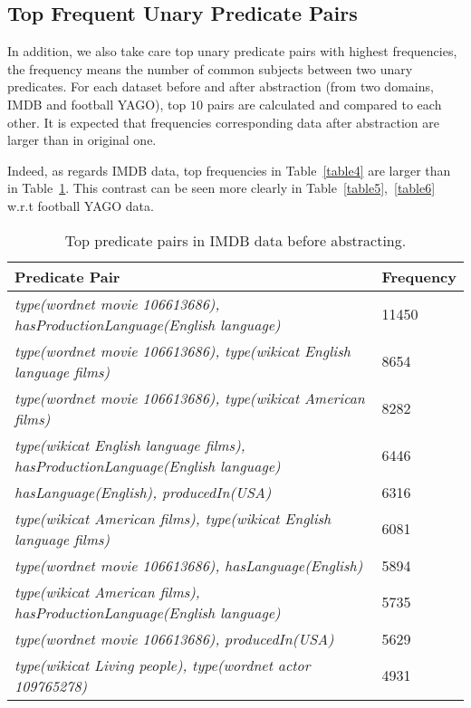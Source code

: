 \documentclass{acm_proc_article-sp}
\begin{document}
\subsection{Top Frequent Unary Predicate Pairs}

In addition, we also take care top unary predicate pairs with highest frequencies, the frequency means the number of common subjects between two unary predicates. For each dataset before and after abstraction (from two domains, IMDB and football YAGO), top $10$ pairs are calculated and compared to each other. It is expected that frequencies corresponding data after abstraction are larger than in original one.

Indeed, as regards IMDB data, top frequencies in Table~\ref{table4} are larger than in Table~\ref{table3}. This contrast can be seen more clearly in Table~\ref{table5},~\ref{table6} w.r.t football YAGO data.

\begin{table}
\caption{Top predicate pairs in IMDB data before abstracting.}
\label{table3}
\begin{center}
\begin{tabular}{ |p{6cm}|p{1.5cm}| } 
\hline
Predicate Pair & Frequency\\
\hline
\textit{type(wordnet movie 106613686), hasProductionLanguage(English language)} & 11450 \\
\hline
\textit{type(wordnet movie 106613686), type(wikicat English language films)} & 8654 \\
\hline
\textit{type(wordnet movie 106613686), type(wikicat American films)} & 8282 \\
\hline
\textit{type(wikicat English language films), hasProductionLanguage(English language)} & 6446 \\
\hline
\textit{hasLanguage(English), producedIn(USA)} & 6316 \\
\hline
\textit{type(wikicat American films), type(wikicat English language films)} & 6081 \\
\hline
\textit{type(wordnet movie 106613686), hasLanguage(English)} & 5894 \\
\hline
\textit{type(wikicat American films), hasProductionLanguage(English language)} & 5735 \\
\hline
\textit{type(wordnet movie 106613686), producedIn(USA)} & 5629 \\
\hline
\textit{type(wikicat Living people), type(wordnet actor 109765278)} & 4931 \\
\hline
\end{tabular}
\end{center}
\end{table}
\end{document}
